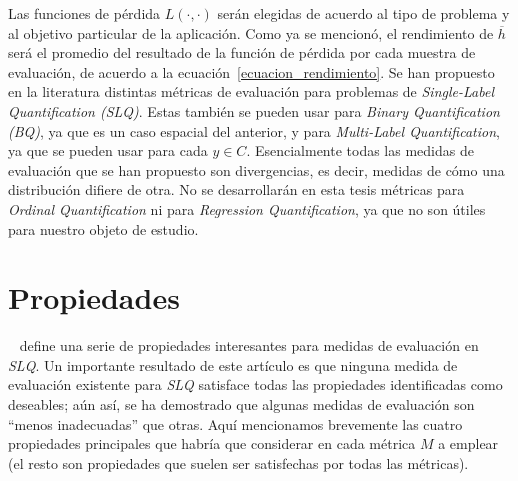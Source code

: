Las funciones de pérdida $L(\cdot, \cdot)$ serán elegidas de acuerdo al tipo de
problema y al objetivo particular de la aplicación. Como ya se mencionó, el
rendimiento de $\overline{h}$ será el promedio del resultado de la función de
pérdida por cada muestra de evaluación, de acuerdo a la
ecuación~\ref{ecuacion_rendimiento}. Se han propuesto en la literatura distintas
métricas de evaluación para problemas de {\it Single-Label Quantification
(SLQ)}. Estas también se pueden usar para {\it Binary Quantification (BQ)}, ya
que es un caso espacial del anterior, y para {\it Multi-Label Quantification},
ya que se pueden usar para cada $y \in C$. Esencialmente todas las medidas de
evaluación que se han propuesto son divergencias, es decir, medidas de cómo una
distribución difiere de otra. No se desarrollarán en esta tesis métricas para
{\it Ordinal Quantification\/} ni para {\it Regression Quantification}, ya que
no son útiles para nuestro objeto de estudio.

\section{Propiedades}\label{evaluacion:propiedades}

~\citet{sebastiani2020evaluation} define una serie de propiedades interesantes
para medidas de evaluación en {\it SLQ}. Un importante resultado de este
artículo es que ninguna medida de evaluación existente para {\it SLQ\/}
satisface todas las propiedades identificadas como deseables; aún así, se ha
demostrado que algunas medidas de evaluación son “menos inadecuadas” que otras.
Aquí mencionamos brevemente las cuatro propiedades principales que habría que
considerar en cada métrica $M$ a emplear (el resto son propiedades que suelen
ser satisfechas por todas las métricas).

